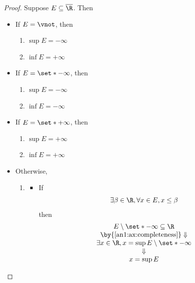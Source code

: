 \begin{proof}
  Suppose $E \subseteq \overline{\R}$. Then
  \begin{itemize}
    \item If $E = \vnot$, then
          \begin{enumerate}[label=\textbf{(\Alph*)}]
            \item $\sup E = - \infty$
            \item $\inf E = + \infty$
          \end{enumerate}
    \item If $E = \set*{- \infty}$, then
          \begin{enumerate}[label=\textbf{(\Alph*)}]
            \item $\sup E = - \infty$
            \item $\inf E = - \infty$
          \end{enumerate}
    \item If $E = \set*{+ \infty}$, then
          \begin{enumerate}[label=\textbf{(\Alph*)}]
            \item $\sup E = + \infty$
            \item $\inf E = + \infty$
          \end{enumerate}
    \item Otherwise,
          \begin{enumerate}[label=\textbf{(\Alph*)}]
            \item \begin{itemize}
                    \item If
                          \[
                            \exists \beta \in \R, \forall x \in E, x \leq \beta
                          \]
                          then
                          \[
                            \begin{array}{c}
                              E \setminus \set*{- \infty} \subseteq \R               \\
                              \by{\Cref{an1:ax:completeness}} \Downarrow             \\
                              \exists x \in \R, x = \sup E \setminus \set*{- \infty} \\
                              \Downarrow                                             \\
                              x = \sup E
                            \end{array}
                          \]

\end{itemize}
\end{enumerate}
\end{itemize}
\end{proof}
